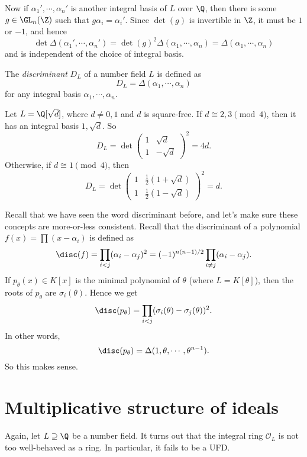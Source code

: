 \documentclass[a4paper]{article}
\begin{document}
Now if $\alpha_1', \cdots, \alpha_n'$ is another integral basis of $L$ over $\Q$, then there is some $g \in \GL_n(\Z)$ such that $g\alpha_i = \alpha_i'$. Since $\det (g)$ is invertible in $\Z$, it must be $1$ or $-1$, and hence
\[
  \det \Delta(\alpha_1', \cdots, \alpha_n') = \det(g)^2 \Delta (\alpha_1, \cdots, \alpha_n) = \Delta(\alpha_1, \cdots, \alpha_n)
\]
and is independent of the choice of integral basis.
\begin{defi}[Discriminant]
  The \emph{discriminant} $D_L$ of a number field $L$ is defined as
  \[
    D_L = \Delta(\alpha_1, \cdots, \alpha_n)
  \]
  for any integral basis $\alpha_1, \cdots, \alpha_n$.
\end{defi}

\begin{eg}
  Let $L = \Q[\sqrt{d}]$, where $d \not= 0, 1$ and $d$ is square-free. If $d \cong 2, 3 \pmod 4$, then it has an integral basis $1, \sqrt{d}$. So
  \[
    D_L = \det
    \begin{pmatrix}
      1 & \sqrt{d}\\
      1 & -\sqrt{d}
    \end{pmatrix}^2 = 4d.
  \]
  Otherwise, if $d \cong 1 \pmod 4$, then
  \[
    D_L = \det
    \begin{pmatrix}
      1 & \frac{1}{2}(1 + \sqrt{d})\\
      1 & \frac{1}{2}(1 - \sqrt{d})
    \end{pmatrix}^2 = d.
  \]
\end{eg}

Recall that we have seen the word discriminant before, and let's make sure these concepts are more-or-less consistent. Recall that the discriminant of a polynomial $f(x) = \prod (x - \alpha_i)$ is defined as
\[
  \disc(f) = \prod_{i < j} (\alpha_i - \alpha_j)^2 = (-1)^{n(n - 1)/2}\prod_{i \not= j}(\alpha_i - \alpha_j).
\]
If $p_\theta(x) \in K[x]$ is the minimal polynomial of $\theta$ (where $L = K[\theta]$), then the roots of $p_\theta$ are $\sigma_i(\theta)$. Hence we get
\[
  \disc(p_\theta) = \prod_{i < j}(\sigma_i(\theta) - \sigma_j(\theta))^2.
\]
In other words,
\[
  \disc(p_\theta) = \Delta(1, \theta, \cdots, \theta^{n - 1}).
\]
So this makes sense.


\section{Multiplicative structure of ideals}
Again, let $L \supseteq \Q$ be a number field. It turns out that the integral ring $\mathcal{O}_L$ is not too well-behaved as a ring. In particular, it fails to be a UFD.
\end{document}
